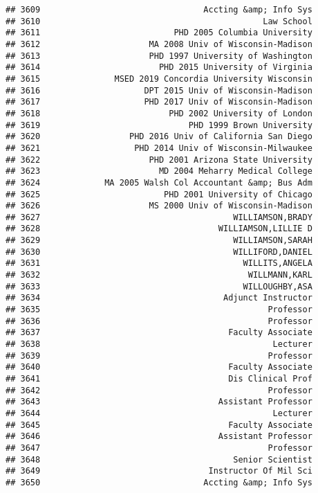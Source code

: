 \documentclass[
]{article}
\begin{document}
\begin{verbatim}
## 3609                                 Accting &amp; Info Sys
## 3610                                             Law School
## 3611                           PHD 2005 Columbia University
## 3612                      MA 2008 Univ of Wisconsin-Madison
## 3613                      PHD 1997 University of Washington
## 3614                        PHD 2015 University of Virginia
## 3615               MSED 2019 Concordia University Wisconsin
## 3616                     DPT 2015 Univ of Wisconsin-Madison
## 3617                     PHD 2017 Univ of Wisconsin-Madison
## 3618                          PHD 2002 University of London
## 3619                              PHD 1999 Brown University
## 3620                  PHD 2016 Univ of California San Diego
## 3621                   PHD 2014 Univ of Wisconsin-Milwaukee
## 3622                      PHD 2001 Arizona State University
## 3623                        MD 2004 Meharry Medical College
## 3624             MA 2005 Walsh Col Accountant &amp; Bus Adm
## 3625                         PHD 2001 University of Chicago
## 3626                      MS 2000 Univ of Wisconsin-Madison
## 3627                                       WILLIAMSON,BRADY
## 3628                                    WILLIAMSON,LILLIE D
## 3629                                       WILLIAMSON,SARAH
## 3630                                       WILLIFORD,DANIEL
## 3631                                         WILLITS,ANGELA
## 3632                                          WILLMANN,KARL
## 3633                                         WILLOUGHBY,ASA
## 3634                                     Adjunct Instructor
## 3635                                              Professor
## 3636                                              Professor
## 3637                                      Faculty Associate
## 3638                                               Lecturer
## 3639                                              Professor
## 3640                                      Faculty Associate
## 3641                                      Dis Clinical Prof
## 3642                                              Professor
## 3643                                    Assistant Professor
## 3644                                               Lecturer
## 3645                                      Faculty Associate
## 3646                                    Assistant Professor
## 3647                                              Professor
## 3648                                       Senior Scientist
## 3649                                  Instructor Of Mil Sci
## 3650                                 Accting &amp; Info Sys

\end{verbatim}
\end{document}
